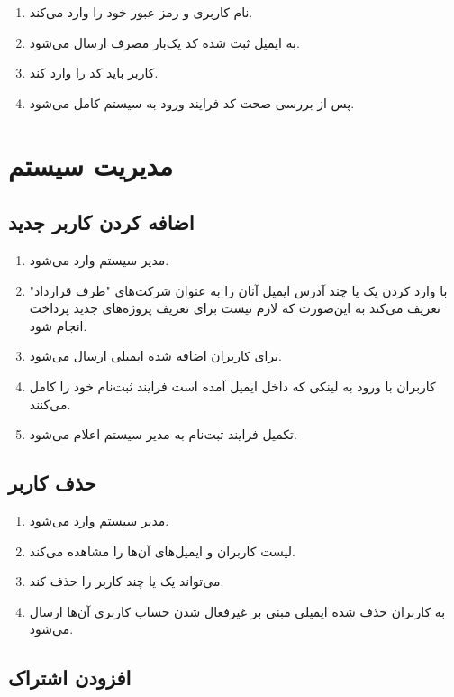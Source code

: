 \documentclass[10pt,a4paper]{article}
\begin{document}
\begin{enumerate}
	\item 
	نام کاربری و رمز عبور خود را وارد می‌کند.
	\item
	به ایمیل ثبت شده کد یک‌بار مصرف ارسال می‌شود.
	\item
	کاربر باید کد را وارد کند.
	\item
	پس از بررسی صحت کد فرایند ورود به سیستم کامل می‌شود.
	
\end{enumerate}

\section{
مدیریت سیستم
}

\subsection{
	اضافه کردن کاربر جدید
}

\begin{enumerate}
	\item 
	مدیر سیستم وارد می‌شود.
	\item
	با وارد کردن یک یا چند آدرس ایمیل آنان را به عنوان شرکت‌های "طرف قرارداد" تعریف می‌کند به این‌صورت که لازم نیست برای تعریف پروژه‌های جدید پرداخت انجام شود.
	\item
	برای کاربران اضافه شده ایمیلی ارسال می‌شود.
	\item
	کاربران با ورود به لینکی که داخل ایمیل آمده است فرایند ثبت‌نام خود را کامل می‌کنند.
	\item
	تکمیل فرایند ثبت‌نام به مدیر سیستم اعلام می‌شود.
\end{enumerate}

\subsection{
حذف کاربر
}
\begin{enumerate}
	\item 
مدیر سیستم وارد می‌شود.
\item
لیست کاربران و ایمیل‌های آن‌ها را مشاهده می‌کند.
\item
می‌تواند یک یا چند کاربر را حذف کند.
\item
به کاربران حذف شده ایمیلی مبنی بر غیرفعال شدن حساب کاربری آن‌ها ارسال می‌شود.
\end{enumerate}

\subsection{
افزودن اشتراک 
}
\end{document}
